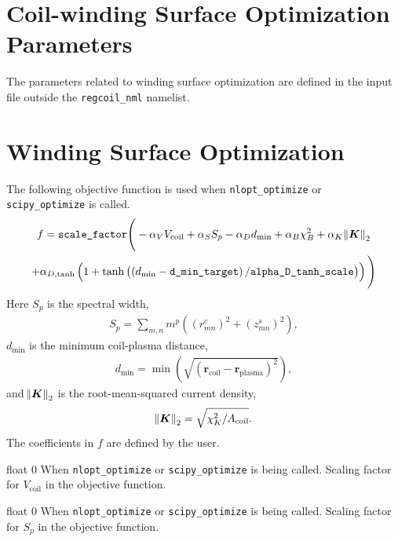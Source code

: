 \section{Coil-winding Surface Optimization Parameters}

\myhrule

The parameters related to winding surface optimization are defined in the input file outside the \texttt{regcoil\_nml} namelist. 

\myhrule

\section{Winding Surface Optimization}

The following objective function is used when \texttt{nlopt\_optimize} or \texttt{scipy\_optimize} is called.
\begin{multline}
f = \texttt{scale\_factor} \Bigg( -\alpha_V V_{\text{coil}} + \alpha_S S_p - \alpha_D d_{\text{min}} + \alpha_B \chi^2_B + \alpha_K \norm{\bm{K}}_2 \\ + \alpha_{D,\tanh} \left(1 + \tanh\left( \left( d_{\min}-\texttt{d\_min\_target} \right)/\texttt{alpha\_D\_tanh\_scale} \right) \right) \Bigg)
\end{multline}
Here $S_p$ is the spectral width,
\begin{gather}
S_p = \sum_{m,n} m^p \left( \left(r_{mn}^c\right)^2 + \left(z_{mn}^s\right)^2 \right),
\label{spectral_width}
\end{gather}
$d_{\text{min}}$ is the minimum coil-plasma distance,
\begin{gather}
d_{\text{min}} = \min \left( \sqrt{ \left(\bm{r}_{\text{coil}} - \bm{r}_{\text{plasma}} \right)^2 } \right),
\end{gather}
and $\norm{\bm{K}}_2$ is the root-mean-squared current density,
\begin{gather}
\norm{\bm{K}}_2 = \sqrt{\chi^2_K/A_{\text{coil}}}.
\end{gather}
The coefficients in $f$ are defined by the user. 

\myhrule

{float}
{0}
{When \texttt{nlopt\_optimize} or \texttt{scipy\_optimize} is being called.}
{Scaling factor for $V_{\text{coil}}$ in the objective function.}

\myhrule

{float}
{0}
{When \texttt{nlopt\_optimize} or \texttt{scipy\_optimize} is being called.}
{Scaling factor for $S_p$ in the objective function.}

